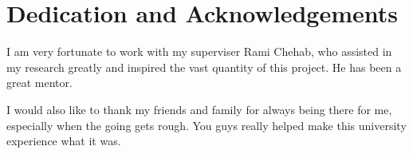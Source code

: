 \documentclass[ oneside,%
                    author={Joshua Felmeden},
                    degree={MEng},
                     title={Semantic Analysis of Financial Headlines Based on Realised Stock Returns},
                  subtitle={}]{dissertation}
\begin{document}


\chapter*{Dedication and Acknowledgements}



I am very fortunate to work with my superviser Rami Chehab, who assisted in my research greatly and inspired the vast quantity of this project. He has been a great mentor.

I would also like to thank my friends and family for always being there for me, especially when the going gets rough. You guys really helped make this university experience what it was.







\end{document}
